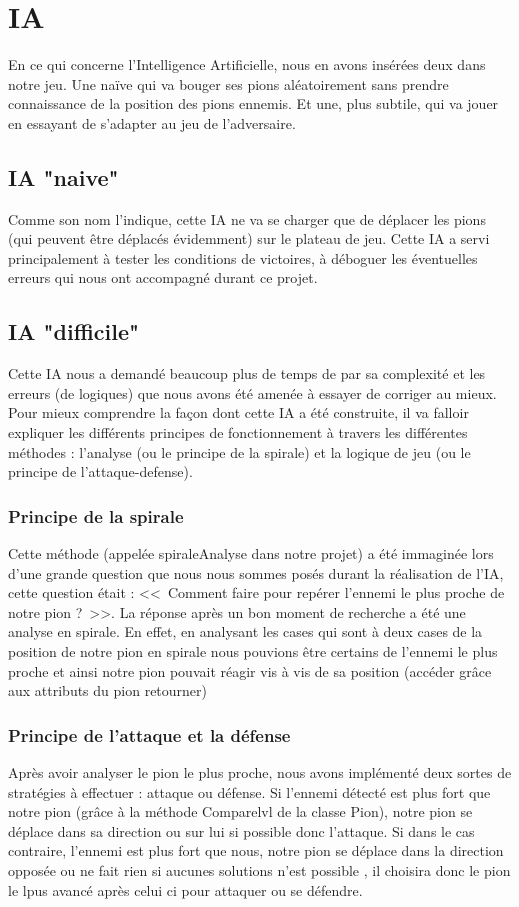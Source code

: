 \documentclass[10pt]{article}
\begin{document}
\section{IA}
 En ce qui concerne l'Intelligence Artificielle, nous en avons insérées deux dans notre jeu. Une naïve qui va bouger ses pions aléatoirement sans prendre connaissance de la position des pions ennemis. Et une, plus subtile, qui va jouer en essayant de s'adapter au jeu de l'adversaire.
\subsection{IA "naive"}

Comme son nom l'indique, cette IA ne va se charger que de déplacer les pions (qui peuvent être déplacés évidemment) sur le plateau de jeu.
Cette IA a servi principalement à tester les conditions de victoires, à déboguer les éventuelles erreurs qui nous ont accompagné durant ce projet.

\subsection {IA "difficile"}
Cette IA nous a demandé beaucoup plus de temps de par sa complexité et les erreurs (de logiques) que nous avons été amenée à essayer de corriger au mieux. Pour mieux comprendre la façon dont cette IA a été construite, il va falloir expliquer les différents principes de fonctionnement à travers les différentes méthodes : l'analyse (ou le principe de la spirale) et la logique de jeu (ou le principe de l'attaque-defense).

\subsubsection {Principe de la spirale}
Cette méthode (appelée spiraleAnalyse dans notre projet) a été immaginée lors d'une grande question que nous nous sommes posés durant la réalisation de l'IA, cette question était : <<~Comment faire pour repérer l'ennemi le plus proche de notre pion ?~>>. La réponse après un bon moment de recherche a été une analyse en spirale. En effet, en analysant les cases qui sont à deux cases de la position de notre pion en spirale nous pouvions être certains de l'ennemi le plus proche et ainsi notre pion pouvait réagir vis à vis de sa position (accéder grâce aux attributs du pion retourner)  
\subsubsection {Principe de l'attaque et la défense}
Après avoir analyser le pion le plus proche, nous avons implémenté deux sortes de stratégies à effectuer : attaque ou défense. Si l'ennemi détecté est plus fort que notre pion (grâce à la méthode Comparelvl de la classe Pion), notre pion se déplace dans sa direction ou sur lui si possible donc l'attaque. Si dans le cas contraire, l'ennemi est plus fort que nous, notre pion se déplace dans la direction opposée ou ne fait rien si aucunes solutions n'est possible , il choisira donc le pion le lpus avancé après celui ci pour attaquer ou se défendre.
\end{document}
